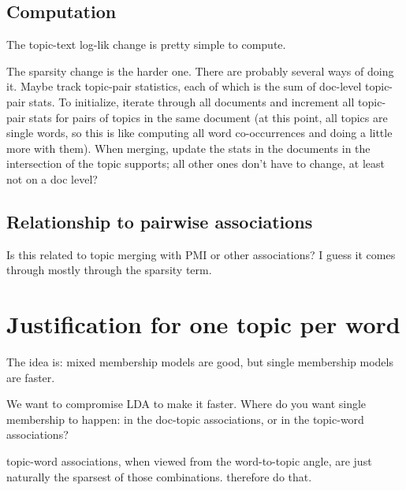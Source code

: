 \documentclass[11pt,letterpaper]{article}
\theoremstyle{definition}
\begin{document}
\subsection{Computation}
The topic-text log-lik change is pretty simple to compute.

The sparsity change is the harder one.  There are probably several ways of doing it.  Maybe track topic-pair statistics, each of which is the sum of doc-level topic-pair stats.  To initialize, iterate through all documents and increment all topic-pair stats for pairs of topics in the same document (at this point, all topics are single words, so this is like computing all word co-occurrences and doing a little more with them).  When merging, update the stats in the documents in the intersection of the topic supports; all other ones don't have to change, at least not on a doc level?

\subsection{Relationship to pairwise associations}
Is this related to topic merging with PMI or other associations?
I guess it comes through mostly through the sparsity term.

\section{Justification for one topic per word}

The idea is: mixed membership models are good, but single membership models are faster.

We want to compromise LDA to make it faster.
Where do you want single membership to happen: in the doc-topic associations, or in the topic-word associations?

topic-word associations, when viewed from the word-to-topic angle, are just naturally the sparsest of those combinations.  therefore do that.

\end{document}
